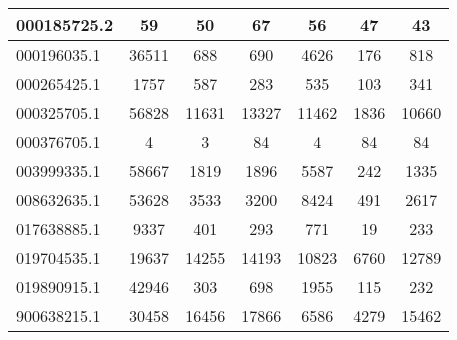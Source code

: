 \begin{adjustbox}{center}
\begin{tabular}{|l||c|c|c|c|c|c|}
\hline
000185725.2 & \cellcolor[RGB]{251, 223, 223} 59 & \cellcolor[RGB]{241, 241, 253} 50 & \cellcolor[RGB]{246, 177, 177} 67 & \cellcolor[RGB]{253, 237, 237} 56 & \cellcolor[RGB]{227, 227, 252} 47 & \cellcolor[RGB]{209, 209, 250} 43 \\
\hline
000196035.1 & \cellcolor[RGB]{235, 71, 71} 36511 & \cellcolor[RGB]{232, 232, 252} 688 & \cellcolor[RGB]{232, 232, 252} 690 & \cellcolor[RGB]{235, 71, 71} 4626 & \cellcolor[RGB]{48, 48, 232} 176 & \cellcolor[RGB]{252, 232, 232} 818 \\
\hline
000265425.1 & \cellcolor[RGB]{235, 71, 71} 1757 & \cellcolor[RGB]{252, 227, 227} 587 & \cellcolor[RGB]{227, 227, 252} 283 & \cellcolor[RGB]{253, 237, 237} 535 & \cellcolor[RGB]{195, 195, 248} 103 & \cellcolor[RGB]{237, 237, 253} 341 \\
\hline
000325705.1 & \cellcolor[RGB]{235, 71, 71} 56828 & \cellcolor[RGB]{254, 250, 250} 11631 & \cellcolor[RGB]{235, 71, 71} 13327 & \cellcolor[RGB]{250, 250, 254} 11462 & \cellcolor[RGB]{48, 48, 232} 1836 & \cellcolor[RGB]{218, 218, 251} 10660 \\
\hline
000376705.1 & \cellcolor[RGB]{232, 232, 252} 4 & \cellcolor[RGB]{232, 232, 252} 3 & \cellcolor[RGB]{252, 232, 232} 84 & \cellcolor[RGB]{232, 232, 252} 4 & \cellcolor[RGB]{252, 232, 232} 84 & \cellcolor[RGB]{252, 232, 232} 84 \\
\hline
003999335.1 & \cellcolor[RGB]{235, 71, 71} 58667 & \cellcolor[RGB]{250, 250, 254} 1819 & \cellcolor[RGB]{254, 250, 250} 1896 & \cellcolor[RGB]{235, 71, 71} 5587 & \cellcolor[RGB]{94, 94, 237} 242 & \cellcolor[RGB]{218, 218, 251} 1335 \\
\hline
008632635.1 & \cellcolor[RGB]{235, 71, 71} 53628 & \cellcolor[RGB]{254, 246, 246} 3533 & \cellcolor[RGB]{246, 246, 254} 3200 & \cellcolor[RGB]{235, 71, 71} 8424 & \cellcolor[RGB]{94, 94, 237} 491 & \cellcolor[RGB]{223, 223, 251} 2617 \\
\hline
017638885.1 & \cellcolor[RGB]{235, 71, 71} 9337 & \cellcolor[RGB]{253, 237, 237} 401 & \cellcolor[RGB]{241, 241, 253} 293 & \cellcolor[RGB]{235, 71, 71} 771 & \cellcolor[RGB]{172, 172, 246} 19 & \cellcolor[RGB]{227, 227, 252} 233 \\
\hline
019704535.1 & \cellcolor[RGB]{235, 71, 71} 19637 & \cellcolor[RGB]{253, 241, 241} 14255 & \cellcolor[RGB]{254, 246, 246} 14193 & \cellcolor[RGB]{223, 223, 251} 10823 & \cellcolor[RGB]{177, 177, 246} 6760 & \cellcolor[RGB]{246, 246, 254} 12789 \\
\hline
019890915.1 & \cellcolor[RGB]{235, 71, 71} 42946 & \cellcolor[RGB]{237, 237, 253} 303 & \cellcolor[RGB]{253, 237, 237} 698 & \cellcolor[RGB]{235, 71, 71} 1955 & \cellcolor[RGB]{218, 218, 251} 115 & \cellcolor[RGB]{227, 227, 252} 232 \\
\hline
900638215.1 & \cellcolor[RGB]{245, 168, 168} 30458 & \cellcolor[RGB]{254, 250, 250} 16456 & \cellcolor[RGB]{254, 246, 246} 17866 & \cellcolor[RGB]{218, 218, 251} 6586 & \cellcolor[RGB]{209, 209, 250} 4279 & \cellcolor[RGB]{255, 255, 255} 15462 \\
\hline
\end{tabular}
\end{adjustbox}
